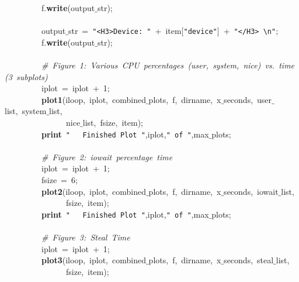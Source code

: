 \mbox{}\ \ \ \ \ \ \ \ \ f.\textbf{write}(output$\_$str); \\
\mbox{}\ \ \ \ \ \ \ \ \  \\
\mbox{}\ \ \ \ \ \ \ \ \ output$\_$str\ =\ \texttt{"{}\textless{}H3\textgreater{}Device:\ "{}}\ +\ item[\texttt{"{}device"{}}]\ +\ \texttt{"{}\textless{}/H3\textgreater{}\ \textbackslash{}n"{}}; \\
\mbox{}\ \ \ \ \ \ \ \ \ f.\textbf{write}(output$\_$str); \\
\mbox{}\ \ \ \ \ \ \ \ \  \\
\mbox{}\ \ \ \ \ \ \ \ \ \textit{\#\ Figure\ 1:\ Various\ CPU\ percentages\ (user,\ system,\ nice)\ vs.\ time\ (3\ subplots)} \\
\mbox{}\ \ \ \ \ \ \ \ \ iplot\ =\ iplot\ +\ 1; \\
\mbox{}\ \ \ \ \ \ \ \ \ \textbf{plot1}(iloop,\ iplot,\ combined$\_$plots,\ f,\ dirname,\ x$\_$seconds,\ user$\_$list,\ system$\_$list,\  \\
\mbox{}\ \ \ \ \ \ \ \ \ \ \ \ \ \ \ nice$\_$list,\ fsize,\ item); \\
\mbox{}\ \ \ \ \ \ \ \ \ \textbf{print}\ \texttt{"{}\ \ \ Finished\ Plot\ "{}},iplot,\texttt{"{}\ of\ "{}},max$\_$plots; \\
\mbox{}\ \ \ \ \ \ \ \ \  \\
\mbox{}\ \ \ \ \ \ \ \ \ \textit{\#\ Figure\ 2:\ iowait\ percentage\ time} \\
\mbox{}\ \ \ \ \ \ \ \ \ iplot\ =\ iplot\ +\ 1; \\
\mbox{}\ \ \ \ \ \ \ \ \ fsize\ =\ 6; \\
\mbox{}\ \ \ \ \ \ \ \ \ \textbf{plot2}(iloop,\ iplot,\ combined$\_$plots,\ f,\ dirname,\ x$\_$seconds,\ iowait$\_$list,\  \\
\mbox{}\ \ \ \ \ \ \ \ \ \ \ \ \ \ \ fsize,\ item); \\
\mbox{}\ \ \ \ \ \ \ \ \ \textbf{print}\ \texttt{"{}\ \ \ Finished\ Plot\ "{}},iplot,\texttt{"{}\ of\ "{}},max$\_$plots; \\
\mbox{}\ \ \ \ \ \ \ \ \  \\
\mbox{}\ \ \ \ \ \ \ \ \ \textit{\#\ Figure\ 3:\ Steal\ Time} \\
\mbox{}\ \ \ \ \ \ \ \ \ iplot\ =\ iplot\ +\ 1; \\
\mbox{}\ \ \ \ \ \ \ \ \ \textbf{plot3}(iloop,\ iplot,\ combined$\_$plots,\ f,\ dirname,\ x$\_$seconds,\ steal$\_$list,\  \\
\mbox{}\ \ \ \ \ \ \ \ \ \ \ \ \ \ \ fsize,\ item); \\
